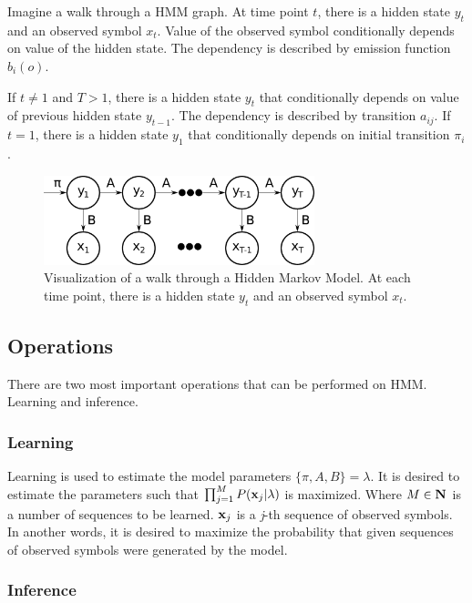 \documentclass[thesis=B,english]{FITthesis}[2012/06/26]
\begin{document}
Imagine a walk through a HMM graph. At time point $t$, there is a hidden state $y_t$ and an observed symbol $x_t$. Value of the observed symbol conditionally depends on value of the hidden state. The dependency is described by emission function $b_i(o)$.

If $t \neq 1$ and $T > 1$, there is a hidden state $y_t$ that conditionally depends on value of previous hidden state $y_{t-1}$. The dependency is described by transition $a_{ij}$. If $t = 1$, there is a hidden state $y_1$ that conditionally depends on initial transition $\pi_i$.

\begin{figure}
	\centering
 	\includegraphics[width=0.7\textwidth]{hmm}
 	\caption{Visualization of a walk through a Hidden Markov Model. At each time point, there is a hidden state $y_t$ and an observed symbol $x_t$.}
 	\label{fig:hmm}
\end{figure}

\subsection{Operations}

There are two most important operations that can be performed on HMM. Learning and inference.

\subsubsection{Learning}

Learning is used to estimate the model parameters $\{\pi, A, B\} = \lambda$. It is desired to estimate the parameters such that $\prod_{j=1}^{M} P(\textbf x_j | \lambda )$ is maximized. Where $M \in \textbf N$ is a number of sequences to be learned. $\textbf x_j$ is a \emph{j}-th sequence of observed symbols. In another words, it is desired to maximize the probability that given sequences of observed symbols were generated by the model.

\subsubsection{Inference}
\end{document}
